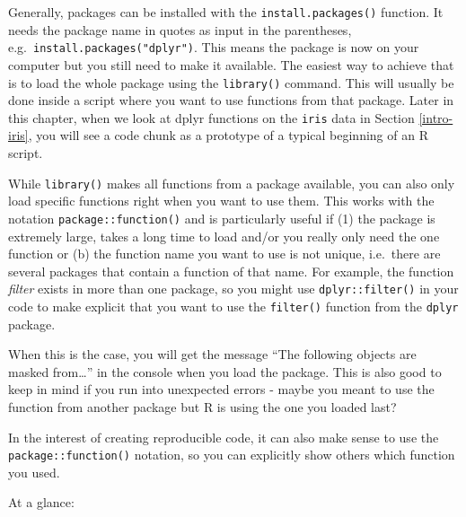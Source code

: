 \documentclass[
]{book}
\begin{document}
Generally, packages can be installed with the \texttt{install.packages()} function.
It needs the package name in quotes as input in the parentheses, e.g.~\texttt{install.packages("dplyr")}.
This means the package is now on your computer but you still need to make it available.
The easiest way to achieve that is to load the whole package using the \texttt{library()} command.
This will usually be done inside a script where you want to use functions from that package.
Later in this chapter, when we look at dplyr functions on the \texttt{iris} data in Section \ref{intro-iris}, you will see a code chunk as a prototype of a typical beginning of an R script.

While \texttt{library()} makes all functions from a package available, you can also only load specific functions right when you want to use them.
This works with the notation \texttt{package::function()} and is particularly useful if (1) the package is extremely large, takes a long time to load and/or you really only need the one function or (b) the function name you want to use is not unique, i.e.~there are several packages that contain a function of that name.
For example, the function \emph{filter} exists in more than one package, so you might use \texttt{dplyr::filter()} in your code to make explicit that you want to use the \texttt{filter()} function from the \texttt{dplyr} package.

When this is the case, you will get the message ``The following objects are masked from\ldots{}'' in the console when you load the package. This is also good to keep in mind if you run into unexpected errors - maybe you meant to use the function from another package but R is using the one you loaded last?

In the interest of creating reproducible code, it can also make sense to use the \texttt{package::function()} notation, so you can explicitly show others which function you used.

At a glance:
\end{document}
